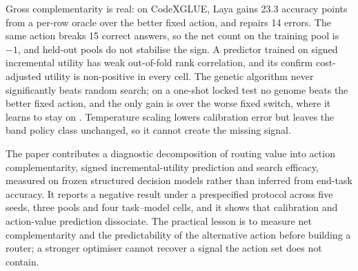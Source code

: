 Gross complementarity is real: on CodeXGLUE, Laya gains 23.3 accuracy points
from a per-row oracle over the better fixed action, and \choice{} repairs 14
\noul{} errors. The same action breaks 15 correct answers, so the net count on
the training pool is $-1$, and held-out pools do not stabilise the sign. A
predictor trained on signed incremental utility has weak out-of-fold rank
correlation, and its confirm cost-adjusted utility is non-positive in every
cell. The genetic algorithm never significantly beats random search; on a
one-shot locked test no genome beats the better fixed action, and the only gain
is over the worse fixed switch, where it learns to stay on \noul{}.
Temperature scaling lowers calibration error but leaves the band policy class
unchanged, so it cannot create the missing signal.

The paper contributes a diagnostic decomposition of routing value into action
complementarity, signed incremental-utility prediction and search efficacy,
measured on frozen structured decision models rather than inferred from
end-task accuracy. It reports a negative result under a prespecified protocol
across five seeds,
three pools and four task--model cells, and it shows that calibration and
action-value prediction dissociate. The practical lesson is to measure net
complementarity and the predictability of the alternative action before
building a router; a stronger optimiser cannot recover a signal the action set
does not contain.

